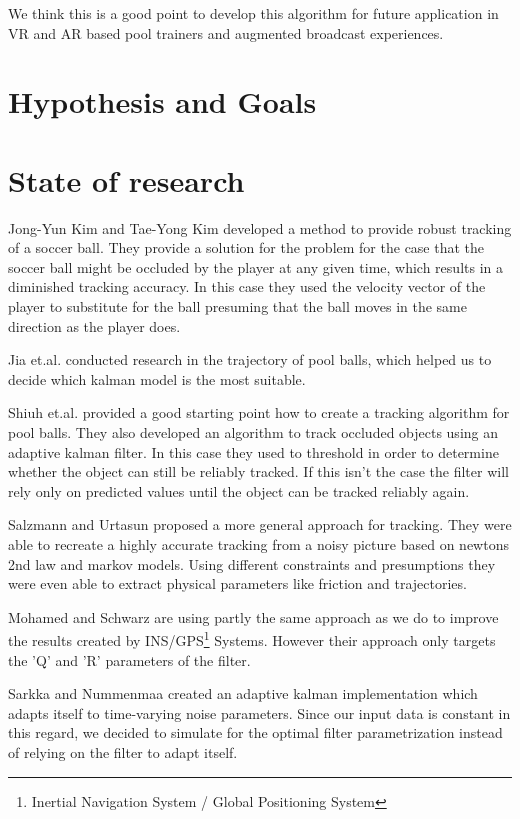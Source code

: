 \documentclass[titlepage, a4paper, 11pt]{scrartcl}
\begin{document}
\begin{multicols}{2}
    We think this is a good point to develop this algorithm for future application in VR and AR based pool trainers and augmented broadcast experiences.

    \section{Hypothesis and Goals}

    \section{State of research}

    Jong-Yun Kim and Tae-Yong Kim \cite{kim} developed a method to provide robust tracking of a soccer ball. 
    They provide a solution for the problem for the case that the soccer ball might be occluded by the player at any given time,
    which results in a diminished tracking accuracy. 
    In this case they used the velocity vector of the player to substitute for the ball presuming that the ball moves in the same direction as the player does.

    Jia et.al. \cite{jia} conducted research in the trajectory of pool balls, which helped us to decide which kalman model is the most suitable.

    Shiuh et.al. \cite{shiuh} provided a good starting point how to create a tracking algorithm for pool balls. They also developed an algorithm to track occluded objects using an adaptive kalman filter.
    In this case they used to threshold in order to determine whether the object can still be reliably tracked. If this isn't the case the filter will rely only on predicted values until the object can be tracked reliably again.

    Salzmann and Urtasun \cite{salzmann} proposed a more general approach for tracking. 
    They were able to recreate a highly accurate tracking from a noisy picture based on newtons 2nd law and markov models.
    Using different constraints and presumptions they were even able to extract physical parameters like friction and trajectories.

    Mohamed and Schwarz \cite{schwarz} are using partly the same approach as we do to improve the results created by INS/GPS\footnote{Inertial Navigation System / Global Positioning System} Systems.
    However their approach only targets the 'Q' and 'R' parameters of the filter.

    Sarkka and Nummenmaa \cite{sarkka} created an adaptive kalman implementation which adapts itself to time-varying noise parameters. Since our input data is constant in this regard,
    we decided to simulate for the optimal filter parametrization instead of relying on the filter to adapt itself.


\end{multicols}
\end{document}
